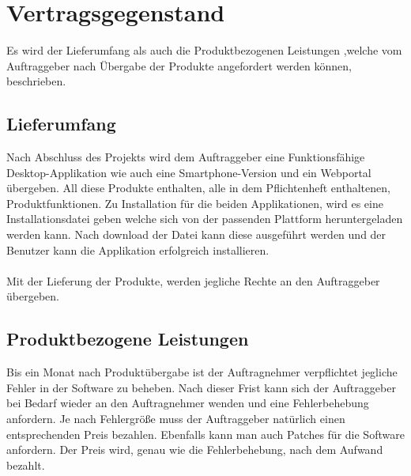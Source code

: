 \section{Vertragsgegenstand}
Es wird der Lieferumfang als auch die Produktbezogenen Leistungen ,welche vom Auftraggeber nach Übergabe der Produkte angefordert werden können, beschrieben.
\subsection{Lieferumfang}
Nach Abschluss des Projekts wird dem Auftraggeber eine Funktionsfähige Desktop-Applikation wie auch eine Smartphone-Version und ein Webportal übergeben. All diese Produkte enthalten, alle in dem Pflichtenheft enthaltenen, Produktfunktionen. Zu Installation für die beiden Applikationen, wird es eine Installationsdatei geben welche sich von der passenden Plattform heruntergeladen werden kann. Nach download der Datei kann diese ausgeführt werden und der Benutzer kann die Applikation erfolgreich installieren. 
\\\\
Mit der Lieferung der Produkte, werden jegliche Rechte an den Auftraggeber übergeben.
\subsection{Produktbezogene Leistungen}
Bis ein Monat nach Produktübergabe ist der Auftragnehmer verpflichtet jegliche Fehler in der Software zu beheben. Nach dieser Frist kann sich der Auftraggeber bei Bedarf wieder an den Auftragnehmer wenden und eine Fehlerbehebung anfordern. Je nach Fehlergröße muss der Auftraggeber natürlich einen entsprechenden Preis bezahlen. Ebenfalls kann man auch Patches für die Software anfordern. Der Preis wird, genau wie die Fehlerbehebung, nach dem Aufwand bezahlt.